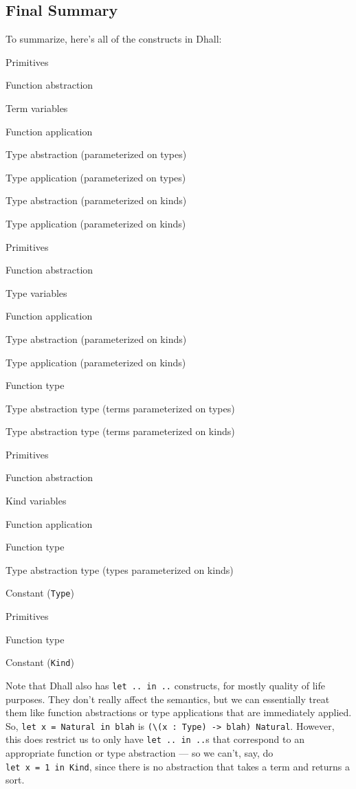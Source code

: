 \documentclass[]{article}
\begin{document}
\hypertarget{final-summary}{%
\subsection{Final Summary}\label{final-summary}}

To summarize, here's all of the constructs in Dhall:

\begin{description}
\tightlist
\item[Term]
Primitives

Function abstraction

Term variables

Function application

Type abstraction (parameterized on types)

Type application (parameterized on types)

Type abstraction (parameterized on kinds)

Type application (parameterized on kinds)
\item[Type]
Primitives

Function abstraction

Type variables

Function application

Type abstraction (parameterized on kinds)

Type application (parameterized on kinds)

Function type

Type abstraction type (terms parameterized on types)

Type abstraction type (terms parameterized on kinds)
\item[Kind]
Primitives

Function abstraction

Kind variables

Function application

Function type

Type abstraction type (types parameterized on kinds)

Constant (\texttt{Type})
\item[Sort]
Primitives

Function type

Constant (\texttt{Kind})
\end{description}

Note that Dhall also has \texttt{let\ ..\ in\ ..} constructs, for mostly quality
of life purposes. They don't really affect the semantics, but we can essentially
treat them like function abstractions or type applications that are immediately
applied. So, \texttt{let\ x\ =\ Natural\ in\ blah} is
\texttt{(\textbackslash{}(x\ :\ Type)\ -\textgreater{}\ blah)\ Natural}.
However, this does restrict us to only have \texttt{let\ ..\ in\ ..}s that
correspond to an appropriate function or type abstraction --- so we can't, say,
do \texttt{let\ x\ =\ 1\ in\ Kind}, since there is no abstraction that takes a
term and returns a sort.
\end{document}
